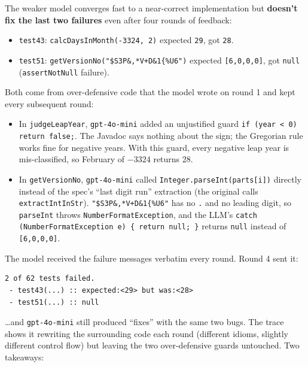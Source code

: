 \documentclass[manuscript,review,nonacm]{acmart}
\begin{document}
\medskip

The weaker model converges fast to a near-correct implementation but
\textbf{doesn't fix the last two failures} even after four rounds of
feedback:

\begin{itemize}\itemsep1pt
\item \texttt{test43}: \texttt{calcDaysInMonth(-3324, 2)} expected
      \texttt{29}, got \texttt{28}.
\item \texttt{test51}:
      \texttt{getVersionNo("\$S3P\&,*V+D\&1\{\%U6")} expected
      \texttt{[6,0,0,0]}, got \texttt{null}
      (\texttt{assertNotNull} failure).
\end{itemize}

Both come from over-defensive code that the model wrote on round 1
and kept every subsequent round:

\begin{itemize}\itemsep1pt
\item In \texttt{judgeLeapYear}, \texttt{gpt-4o-mini} added an
      unjustified guard
      \texttt{if (year < 0) return false;}. The Javadoc says nothing
      about the sign; the Gregorian rule works fine for negative
      years. With this guard, every negative leap year is
      mis-classified, so February of $-3324$ returns 28.
\item In \texttt{getVersionNo}, \texttt{gpt-4o-mini} called
      \texttt{Integer.parseInt(parts[i])} directly instead of the
      spec's ``last digit run'' extraction (the original calls
      \texttt{extractIntInStr}). \texttt{"\$S3P\&,*V+D\&1\{\%U6"} has
      no \texttt{.} and no leading digit, so \texttt{parseInt} throws
      \texttt{NumberFormatException}, and the LLM's
      \texttt{catch (NumberFormatException e) \{ return null; \}}
      returns \texttt{null} instead of \texttt{[6,0,0,0]}.
\end{itemize}

The model received the failure messages verbatim every round. Round 4
sent it:

\begin{lstlisting}
2 of 62 tests failed.
 - test43(...) :: expected:<29> but was:<28>
 - test51(...) :: null
\end{lstlisting}

\dots and \texttt{gpt-4o-mini} still produced ``fixes'' with the same
two bugs. The trace shows it rewriting the surrounding code each
round (different idioms, slightly different control flow) but leaving
the two over-defensive guards untouched. Two takeaways:
\end{document}
